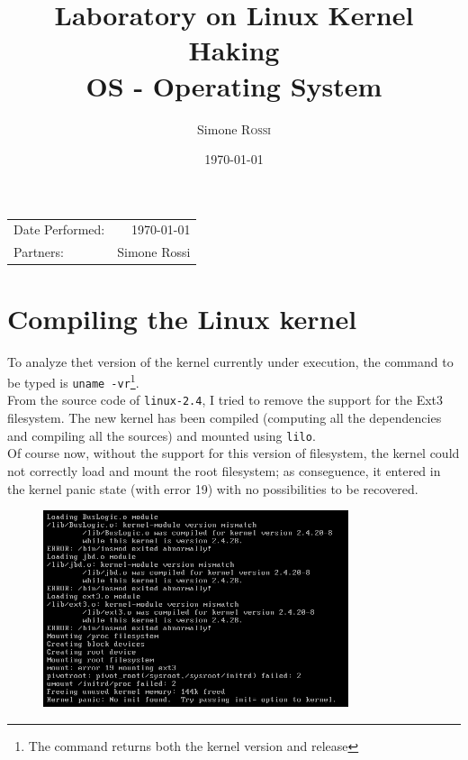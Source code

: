 \documentclass{article}
\title{Laboratory on Linux Kernel Haking \\ OS - Operating System} %
\author{Simone \textsc{Rossi}} %
\date{\today} %
\begin{document}
\maketitle %

\begin{center}
\begin{tabular}{l r}
Date Performed: & \today \\ %
Partners: & Simone Rossi \\ %
\end{tabular}
\end{center}



\section{Compiling the Linux kernel}
To analyze thet version of the kernel currently under execution, the command to be typed is 
\texttt{uname -vr}\footnote{The command returns both the kernel version and release}.\\

From the source code of \texttt{linux-2.4}, I tried to remove the support for the Ext3 
filesystem. The new kernel has been compiled (computing all the dependencies and compiling
all the sources) and mounted using \texttt{lilo}.\\

Of course now, without the support for this version of filesystem, the kernel could not correctly 
load and mount the root filesystem; as conseguence, it entered in the kernel panic state (with error
19) with no possibilities to be recovered.\\

\begin{figure}
\centering
  \includegraphics[width=0.8\textwidth]{./kernel_panic.png}
\end{figure}
\end{document}
